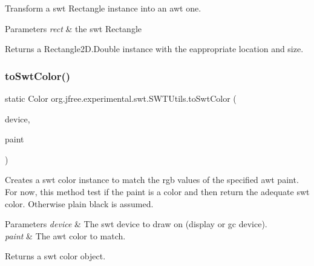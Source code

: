 Transform a swt Rectangle instance into an awt one. 
\begin{DoxyParams}{Parameters}
{\em rect} & the swt {\ttfamily Rectangle} \\
\hline
\end{DoxyParams}
\begin{DoxyReturn}{Returns}
a Rectangle2\+D.\+Double instance with the eappropriate location and size. 
\end{DoxyReturn}
\mbox{\label{classorg_1_1jfree_1_1experimental_1_1swt_1_1_s_w_t_utils_a74249bb66f34e697822e9d94baf0e60a}} 
\subsubsection{\texorpdfstring{to\+Swt\+Color()}{toSwtColor()}\hspace{0.1cm}{\footnotesize\ttfamily [1/2]}}
{\footnotesize\ttfamily static Color org.\+jfree.\+experimental.\+swt.\+S\+W\+T\+Utils.\+to\+Swt\+Color (\begin{DoxyParamCaption}\item[{Device}]{device,  }\item[{java.\+awt.\+Paint}]{paint }\end{DoxyParamCaption})\hspace{0.3cm}{\ttfamily [static]}}

Creates a swt color instance to match the rgb values of the specified awt paint. For now, this method test if the paint is a color and then return the adequate swt color. Otherwise plain black is assumed.


\begin{DoxyParams}{Parameters}
{\em device} & The swt device to draw on (display or gc device). \\
\hline
{\em paint} & The awt color to match. \\
\hline
\end{DoxyParams}
\begin{DoxyReturn}{Returns}
a swt color object. 
\end{DoxyReturn}
\mbox{\label{classorg_1_1jfree_1_1experimental_1_1swt_1_1_s_w_t_utils_aa2e7e30dffdbd5aca9a4663d5a013dd0}} 
